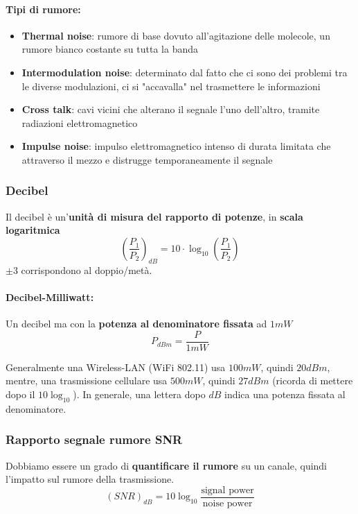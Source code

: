 \paragraph{Tipi di rumore:}
\begin{itemize}
	\item \textbf{Thermal noise}: rumore di base dovuto all'agitazione delle molecole, un rumore bianco costante su tutta la banda

	\item \textbf{Intermodulation noise}: determinato dal fatto che ci sono dei problemi tra le diverse modulazioni, ci si "accavalla" nel trasmettere le informazioni

	\item \textbf{Cross talk}: cavi vicini che alterano il segnale l'uno dell'altro, tramite radiazioni elettromagnetico

	\item \textbf{Impulse noise}: impulso elettromagnetico intenso di durata limitata che attraverso il mezzo e distrugge temporaneamente il segnale
\end{itemize}

\subsubsection{Decibel}
Il decibel è un'\textbf{unità di misura del rapporto di potenze}, in \textbf{scala logaritmica}
$$ \left(\frac{P_1}{P_2}\right)_{dB} = 10 \cdot \log_{10} \left(\frac{P_1}{P_2}\right) $$ 
$\pm 3$ corrispondono al doppio/metà.

\paragraph{Decibel-Milliwatt:} Un decibel ma con la \textbf{potenza al denominatore fissata} ad $1mW$
$$ P_{dBm} = \frac{P}{1mW} $$

Generalmente una Wireless-LAN (WiFi 802.11) usa $100mW$, quindi $20dBm$, mentre, una trasmissione cellulare usa $500mW$, quindi $27dBm$ (ricorda di mettere dopo il $10 \log_{10}$). In generale, una lettera dopo $dB$ indica una potenza fissata al denominatore.

\subsubsection{Rapporto segnale rumore SNR}

Dobbiamo essere un grado di \textbf{quantificare il rumore} su un canale, quindi l'impatto sul rumore della trasmissione.
$$  (SNR)_{dB} = 10 \log_{10} \frac{\text{signal power}}{\text{noise power}} $$

